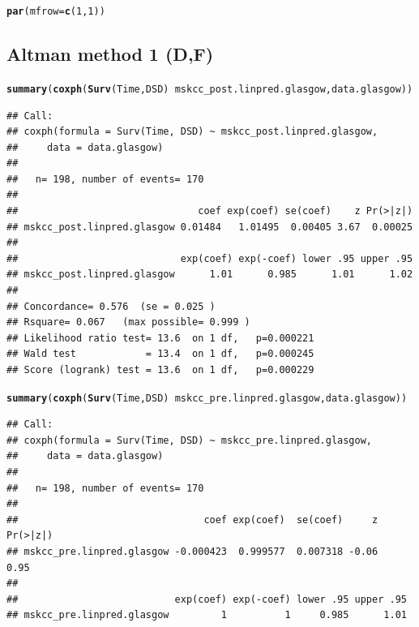 \documentclass{article}\usepackage[]{graphicx}\usepackage[]{color}
\makeatletter
\newcommand{\hlnum}[1]{\textcolor[rgb]{0.686,0.059,0.569}{#1}}%
\newcommand{\hlopt}[1]{\textcolor[rgb]{0,0,0}{#1}}%
\newcommand{\hlstd}[1]{\textcolor[rgb]{0.345,0.345,0.345}{#1}}%
\newcommand{\hlkwc}[1]{\textcolor[rgb]{0.333,0.667,0.333}{#1}}%
\newcommand{\hlkwd}[1]{\textcolor[rgb]{0.737,0.353,0.396}{\textbf{#1}}}%
\newenvironment{kframe}{%
 \def\at@end@of@kframe{}%
 \ifinner\ifhmode%
  \def\at@end@of@kframe{\end{minipage}}%
  \begin{minipage}{\columnwidth}%
 \fi\fi%
 \def\FrameCommand##1{\hskip\@totalleftmargin \hskip-\fboxsep
 \colorbox{shadecolor}{##1}\hskip-\fboxsep
     \hskip-\linewidth \hskip-\@totalleftmargin \hskip\columnwidth}%
 \MakeFramed {\advance\hsize-\width
   \@totalleftmargin\z@ \linewidth\hsize
   \@setminipage}}%
 {\par\unskip\endMakeFramed%
 \at@end@of@kframe}
\newenvironment{knitrout}{}{} %
\makeatother
\begin{document}
\begin{knitrout}
{}


\begin{kframe}\begin{alltt}
\hlkwd{par}\hlstd{(}\hlkwc{mfrow} \hlstd{=} \hlkwd{c}\hlstd{(}\hlnum{1}\hlstd{,} \hlnum{1}\hlstd{))}
\end{alltt}
\end{kframe}
\end{knitrout}

\subsection{Altman method 1 (D,F)}
\begin{knitrout}
\color{fgcolor}\begin{kframe}
\begin{alltt}
\hlkwd{summary}\hlstd{(}\hlkwd{coxph}\hlstd{(}\hlkwd{Surv}\hlstd{(Time, DSD)} \hlopt{~} \hlstd{mskcc_post.linpred.glasgow, data.glasgow))}
\end{alltt}
\begin{verbatim}
## Call:
## coxph(formula = Surv(Time, DSD) ~ mskcc_post.linpred.glasgow, 
##     data = data.glasgow)
## 
##   n= 198, number of events= 170 
## 
##                               coef exp(coef) se(coef)    z Pr(>|z|)
## mskcc_post.linpred.glasgow 0.01484   1.01495  0.00405 3.67  0.00025
## 
##                            exp(coef) exp(-coef) lower .95 upper .95
## mskcc_post.linpred.glasgow      1.01      0.985      1.01      1.02
## 
## Concordance= 0.576  (se = 0.025 )
## Rsquare= 0.067   (max possible= 0.999 )
## Likelihood ratio test= 13.6  on 1 df,   p=0.000221
## Wald test            = 13.4  on 1 df,   p=0.000245
## Score (logrank) test = 13.6  on 1 df,   p=0.000229
\end{verbatim}
\begin{alltt}
\hlkwd{summary}\hlstd{(}\hlkwd{coxph}\hlstd{(}\hlkwd{Surv}\hlstd{(Time, DSD)} \hlopt{~} \hlstd{mskcc_pre.linpred.glasgow, data.glasgow))}
\end{alltt}
\begin{verbatim}
## Call:
## coxph(formula = Surv(Time, DSD) ~ mskcc_pre.linpred.glasgow, 
##     data = data.glasgow)
## 
##   n= 198, number of events= 170 
## 
##                                coef exp(coef)  se(coef)     z Pr(>|z|)
## mskcc_pre.linpred.glasgow -0.000423  0.999577  0.007318 -0.06     0.95
## 
##                           exp(coef) exp(-coef) lower .95 upper .95
## mskcc_pre.linpred.glasgow         1          1     0.985      1.01

\end{verbatim}
\end{kframe}
\end{knitrout}
\end{document}
